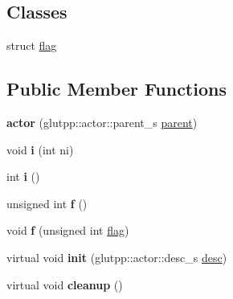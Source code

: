 \subsection*{\-Classes}
\begin{DoxyCompactItemize}
\item 
struct \hyperlink{structglutpp_1_1actor_1_1actor_1_1flag}{flag}
\end{DoxyCompactItemize}
\subsection*{\-Public \-Member \-Functions}
\begin{DoxyCompactItemize}
\item 
\hypertarget{classglutpp_1_1actor_1_1actor_a0ef9991b57680038bd67f2c86e9fe09e}{{\bfseries actor} (glutpp\-::actor\-::parent\-\_\-s \hyperlink{classglutpp_1_1actor_1_1parent}{parent})}\label{classglutpp_1_1actor_1_1actor_a0ef9991b57680038bd67f2c86e9fe09e}

\item 
\hypertarget{classglutpp_1_1actor_1_1actor_acc3a268bcb48b3e1899a5b68fa60ad4d}{void {\bfseries i} (int ni)}\label{classglutpp_1_1actor_1_1actor_acc3a268bcb48b3e1899a5b68fa60ad4d}

\item 
\hypertarget{classglutpp_1_1actor_1_1actor_ac45c88f241bf87e639cf5d0986de8a3b}{int {\bfseries i} ()}\label{classglutpp_1_1actor_1_1actor_ac45c88f241bf87e639cf5d0986de8a3b}

\item 
\hypertarget{classglutpp_1_1actor_1_1actor_a5d800cbcdb4006e59e4923548a73d98f}{unsigned int {\bfseries f} ()}\label{classglutpp_1_1actor_1_1actor_a5d800cbcdb4006e59e4923548a73d98f}

\item 
\hypertarget{classglutpp_1_1actor_1_1actor_a979cbbb3fd55f5bfdc618fbaa63784a6}{void {\bfseries f} (unsigned int \hyperlink{structglutpp_1_1actor_1_1actor_1_1flag}{flag})}\label{classglutpp_1_1actor_1_1actor_a979cbbb3fd55f5bfdc618fbaa63784a6}

\item 
\hypertarget{classglutpp_1_1actor_1_1actor_a384324368dcbe229b6d9b274427f3d12}{virtual void {\bfseries init} (glutpp\-::actor\-::desc\-\_\-s \hyperlink{classglutpp_1_1actor_1_1desc}{desc})}\label{classglutpp_1_1actor_1_1actor_a384324368dcbe229b6d9b274427f3d12}

\item 
\hypertarget{classglutpp_1_1actor_1_1actor_a81deff185f60ffab9373fb68257221fb}{virtual void {\bfseries cleanup} ()}\label{classglutpp_1_1actor_1_1actor_a81deff185f60ffab9373fb68257221fb}


\end{DoxyCompactItemize}
